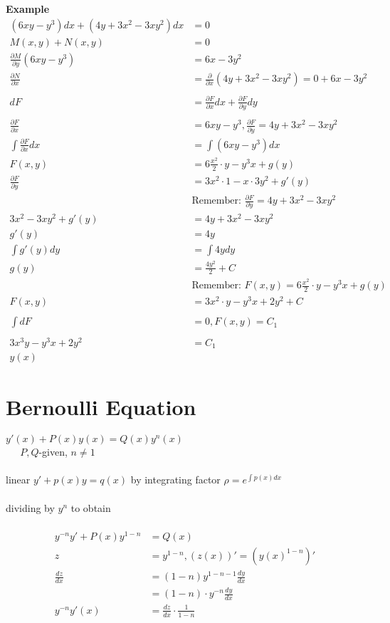 \documentclass[10pt, letterpaper]{article}
\begin{document}
\textbf{Example}
\begin{align*}
(6xy-y^3)dx + (4y+3x^2-3xy^2)dx &= 0\\
M(x,y) + N(x,y) &= 0\\
\frac{\partial M}{\partial y}(6xy - y^3) &= 6x-3y^2\\
\frac{\partial N}{\partial x} &= \frac{\partial}{\partial x} (4y+3x^2-3xy^2) = 0+6x-3y^2\\
\\
dF &= \frac{\partial F}{\partial x} dx + \frac{\partial F}{\partial y} dy\\
\\
\frac{\partial F}{\partial x} &= 6xy-y^3, \frac{\partial F}{\partial y} = 4y+3x^2-3xy^2\\
\int \limits \frac{\partial F}{\partial x} dx &= \int \limits (6xy-y^3)dx\\
F(x,y) &= 6\frac{x^2}{2} \cdot y-y^3x+g(y)\\
\frac{\partial F}{\partial y} &= 3x^2 \cdot 1 - x \cdot 3y^2 + g'(y)\\
&\text{Remember: } \frac{\partial F}{\partial y} = 4y+3x^2-3xy^2\\
3x^2-3xy^2+g'(y) &= 4y+3x^2-3xy^2\\
g'(y) &= 4y\\
\int \limits g'(y) dy &= \int \limits 4y dy\\
g(y) &= \frac{4y^2}{2} + C\\
&\text{Remember: } F(x,y) = 6\frac{x^2}{2} \cdot y-y^3x+g(y)\\
F(x,y) &= 3x^2 \cdot y -y^3x+2y^2+C\\
\\
\int \limits dF &= 0, F(x,y)=C_1\\
\\
3x^3y - y^3x + 2y^2 &= C_1\\
y(x)
\end{align*}

\section{Bernoulli Equation}
$y'(x)+P(x)y(x) = Q(x)y^n(x)$\\
$~~~~~$ $P, Q$-given, $n \neq 1$\\
\\
linear $y' + p(x)y = q(x)$ by integrating factor $\rho = e^{\int \limits p(x) dx}$\\
\\
dividing by $y^n$ to obtain\\
\\
\begin{align*}
y^{-n}y' + P(x)y^{1-n} &= Q(x)\\
z &= y^{1-n}, (z(x))' = (y(x)^{1-n})'\\
\frac{dz}{dx} &= (1-n)y^{1-n-1} \frac{dy}{dx}\\
&= (1-n) \cdot y^{-n} \frac{dy}{dx}\\
y^{-n}y'(x) &= \frac{dz}{dx} \cdot \frac{1}{1-n}
\end{align*}
\end{document}

